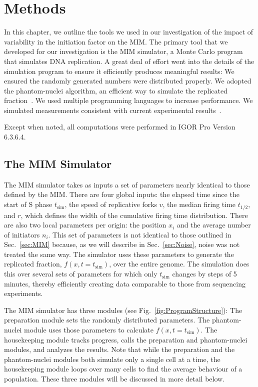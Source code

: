 \chapter{Methods}
\label{ch:Methods}

In this chapter, we outline the tools we used in our investigation of the impact of variability in the initiation factor on the MIM.
The primary tool that we developed for our investigation is the MIM simulator, a Monte Carlo program that simulates DNA replication.
A great deal of effort went into the details of the simulation program to ensure it efficiently produces meaningful results:
We ensured the randomly generated numbers were distributed properly.
We adopted the phantom-nuclei algorithm, an efficient way to simulate the replicated fraction~\cite{KJMA1}.
We used multiple programming languages to increase performance.
We simulated measurements consistent with current experimental results~\cite{StochasticTermination}.

Except when noted, all computations were performed in IGOR Pro Version 6.3.6.4.


	\section{The MIM Simulator}
	\label{sec:MIMSimulator}
	
	The MIM simulator takes as inputs a set of parameters nearly identical to those defined by the MIM.
	There are four global inputs: the elapsed time since the start of S phase $t_\text{sim}$, the speed of replicative forks $v$, the median firing time $t_{1/2}$, and $r$, which defines the width of the cumulative firing time distribution.
	There are also two local parameters per origin: the position $x_i$ and the average number of initiators $n_i$.
	This set of parameters is not identical to those outlined in Sec.~\ref{sec:MIM} because, as we will describe in Sec.~\ref{sec:Noise}, noise was not treated the same way.
	The simulator uses these parameters to generate the replicated fraction, $f(x,t=t_\text{sim})$, over the entire genome.
	The simulation does this over several sets of parameters for which only $t_\text{sim}$ changes by steps of 5 minutes, thereby efficiently creating data comparable to those from sequencing experiments.
	
	The MIM simulator has three modules (see Fig.~\ref{fig:ProgramStructure}):
	The preparation module sets the randomly distributed parameters.
	The phantom-nuclei module uses those parameters to calculate $f(x,t=t_\text{sim})$.
	The housekeeping module tracks progress, calls the preparation and phantom-nuclei modules, and analyzes the results.
	Note that while the preparation and the phantom-nuclei modules both simulate only a single cell at a time, the housekeeping module loops over many cells to find the average behaviour of a population.
	These three modules will be discussed in more detail below.
		
